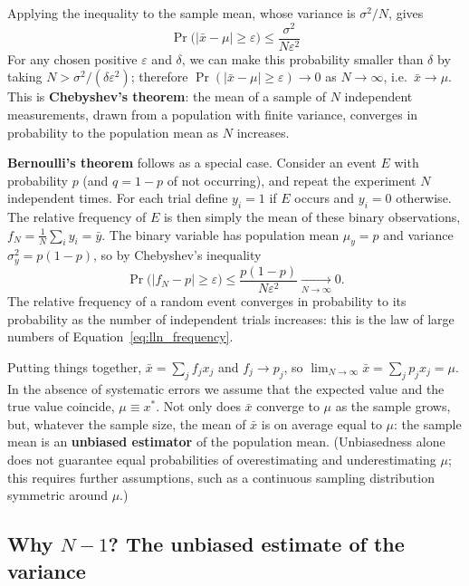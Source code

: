 \documentclass[letterpaper,11pt,leqno]{book}
\begin{document}
Applying the inequality to the sample mean, whose variance is $\sigma^2/N$, gives
\begin{equation}
\boxed{\Pr\big(|\bar{x} - \mu| \ge \varepsilon\big) \le \frac{\sigma^2}{N\varepsilon^2}}
\label{eq:chebyshev_mean}
\end{equation}
For any chosen positive $\varepsilon$ and $\delta$, we can make this probability smaller than $\delta$ by taking $N > \sigma^2/(\delta\varepsilon^2)$; therefore $\Pr(|\bar{x} - \mu| \ge \varepsilon) \to 0$ as $N \to \infty$, i.e.\ $\bar{x} \to \mu$. This is \textbf{Chebyshev's theorem}: the mean of a sample of $N$ independent measurements, drawn from a population with finite variance, converges in probability to the population mean as $N$ increases.

\textbf{Bernoulli's theorem} follows as a special case. Consider an event $E$ with probability $p$ (and $q = 1 - p$ of not occurring), and repeat the experiment $N$ independent times. For each trial define $y_i = 1$ if $E$ occurs and $y_i = 0$ otherwise. The relative frequency of $E$ is then simply the mean of these binary observations, $f_N = \frac{1}{N}\sum_i y_i = \bar{y}$. The binary variable has population mean $\mu_y = p$ and variance $\sigma_y^2 = p(1 - p)$, so by Chebyshev's inequality
\begin{equation}
\Pr\big(|f_N - p| \ge \varepsilon\big) \le \frac{p(1 - p)}{N\varepsilon^2} \xrightarrow[N \to \infty]{} 0.
\label{eq:bernoulli_theorem}
\end{equation}
The relative frequency of a random event converges in probability to its probability as the number of independent trials increases: this is the law of large numbers of Equation~\eqref{eq:lln_frequency}.

Putting things together, $\bar{x} = \sum_j f_jx_j$ and $f_j \to p_j$, so $\lim_{N \to \infty}\bar{x} = \sum_j p_jx_j = \mu$. In the absence of systematic errors we assume that the expected value and the true value coincide, $\mu \equiv x^*$. Not only does $\bar{x}$ converge to $\mu$ as the sample grows, but, whatever the sample size, the mean of $\bar{x}$ is on average equal to $\mu$: the sample mean is an \textbf{unbiased estimator} of the population mean. (Unbiasedness alone does not guarantee equal probabilities of overestimating and underestimating $\mu$; this requires further assumptions, such as a continuous sampling distribution symmetric around $\mu$.)

\subsection{Why \texorpdfstring{$N - 1$}{N - 1}? The unbiased estimate of the variance}
\label{sec:n_minus_one}
\end{document}
